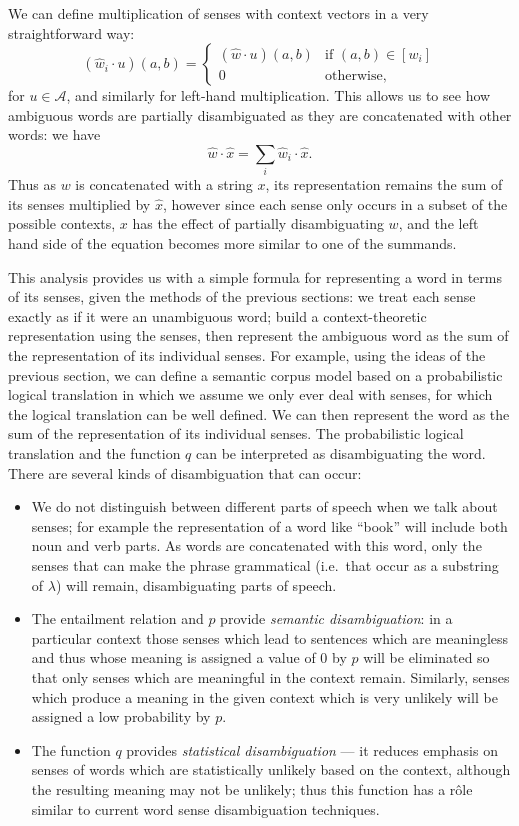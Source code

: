 We can define multiplication of senses with context vectors in a very straightforward way:
$$(\hat{w}_i \cdot u)(a,b) = \begin{cases}
(\hat{w}\cdot u)(a,b) & \text{if } (a,b) \in [w_i]\\
0 & \text{otherwise,}
\end{cases}$$
for $u \in \mathcal{A}$, and similarly for left-hand multiplication. This allows us to see how ambiguous words are partially disambiguated as they are concatenated with other words: we have
$$\hat{w}\cdot\hat{x} = \sum_i\hat{w}_i\cdot\hat{x}.$$
Thus as $w$ is concatenated with a string $x$, its representation remains the sum of its senses multiplied by $\hat{x}$, however since each sense only occurs in a subset of the possible contexts, $x$ has the effect of partially disambiguating $w$, and the left hand side of the equation becomes more similar to one of the summands.

This analysis provides us with a simple formula for representing a word in terms of its senses, given the methods of the previous sections: we treat each sense exactly as if it were an unambiguous word; build a context-theoretic representation using the senses, then represent the ambiguous word as the sum of the representation of its individual senses. For example, using the ideas of the previous section, we can define a semantic corpus model based on a probabilistic logical translation in which we assume we only ever deal with senses, for which the logical translation can be well defined. We can then represent the word as the sum of the representation of its individual senses. The probabilistic logical translation and the function $q$ can be interpreted as disambiguating the word. There are several kinds of disambiguation that can occur:
\begin{itemize}
\item We do not distinguish between different parts of speech when we talk about senses; for example the representation of a word like ``book'' will include both noun and verb parts. As words are concatenated with this word, only the senses that can make the phrase grammatical (i.e.~that occur as a substring of $\lambda$) will remain, disambiguating parts of speech.
\item The entailment relation and $p$ provide \emph{semantic disambiguation}: in a particular context those senses which lead to sentences which are meaningless and thus whose meaning is assigned a value of $0$ by $p$ will be eliminated so that only senses which are meaningful in the context remain. Similarly, senses which produce a meaning in the given context which is very unlikely will be assigned a low probability by $p$.
\item The function $q$ provides \emph{statistical disambiguation} --- it reduces emphasis on senses of words which are statistically unlikely based on the context, although the resulting meaning may not be unlikely; thus this function has a r\^ole similar to current word sense disambiguation techniques.
\end{itemize}


